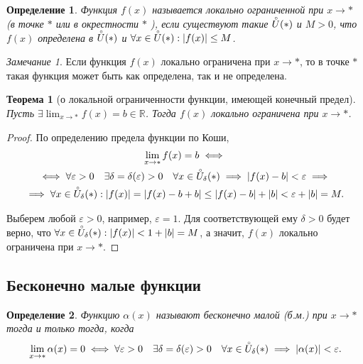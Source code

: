 \documentclass[a4paper,12pt]{article} %
\newtheorem{definition}{Определение}[section]
\newtheorem{theorem}{Теорема}[section]
\theoremstyle{remark}
\newtheorem{remark}{Замечание}[theorem]
\theoremstyle{definition}
\begin{document}
\begin{definition}
	Функция $f(x)$ называется локально ограниченной при  $x \to *$ (в точке $*$ или в окрестности $*$ ), если существуют такие $\accentset{\circ}{U}(*)$ и $M>0$, что $f(x)$ определена в  $\accentset{\circ}{U}(*) $ и $\forall x\in \accentset{\circ}{U}(*) : |f(x)| \le  M$. \\
\end{definition}
\begin{remark}
    Если функция $f(x)$ локально ограничена при $x \to *$, то в точке $*$ такая функция может быть как определена,
    так и не определена.
\end{remark}


\begin{theorem}[о локальной ограниченности функции, имеющей конечный предел]
	Пусть $\displaystyle \exists \lim_{x \to *} f(x) = b \in \mathbb{R}$. Тогда $f(x)$ локально ограничена при $x\to *$.
\end{theorem}
\begin{proof}
	По определению предела функции по Коши,
	\begin{multline}
	\lim_{x \to *} f(x)=b \iff \\
	\iff \forall \varepsilon> 0 \quad \exists \delta=\delta(\varepsilon)>0 \quad \forall x\in \accentset{\circ}{U}_\delta(*) \implies |f(x) - b| < \varepsilon \implies \\
	\implies \forall x\in \accentset{\circ}{U}_\delta(*) : |f(x)| = |f(x) -b + b| \le  |f(x) -b| + |b| < \varepsilon + |b| = M.
	\end{multline}

	Выберем любой $\varepsilon>0$, например, $\varepsilon=1$. Для соответствующей ему $\delta>0$ будет верно, что $\forall x\in \accentset{\circ}{U}_\delta(*) : |f(x)| < 1 + |b| = M$, а значит, $f(x)$ локально ограничена при $x \to *$.
\end{proof}

\subsection{Бесконечно малые функции}
  \begin{definition}
  	Функцию $\alpha(x)$ называют бесконечно малой (б.м.) при $x \to  *$ тогда и только тогда, когда 
  	\[
  	  \lim_{x \to *} \alpha(x) = 0 \iff \forall  \varepsilon>0 \quad \exists \delta=\delta(\varepsilon) > 0 \quad \forall x \in  \accentset{\circ}{U}_\delta(*) \implies |\alpha(x)| < \varepsilon
  	.\] 
  \end{definition}
\end{document}
